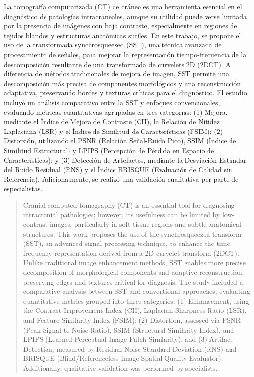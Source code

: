 \begin{resumen}
	La tomografía computarizada (CT) de cráneo es una herramienta esencial en el diagnóstico de patologías intracraneales, aunque su utilidad puede verse limitada por la presencia de imágenes con bajo contraste, especialmente en regiones de tejidos blandos y estructuras anatómicas sutiles. En este trabajo, se propone el uso de la transformada synchrosqueezed (SST), una técnica avanzada de procesamiento de señales, para mejorar la representación tiempo-frecuencia de la descomposición resultante de una transformada de curvelets 2D (2DCT). A diferencia de métodos tradicionales de mejora de imagen, SST permite una descomposición más precisa de componentes morfológicos y una reconstrucción adaptativa, preservando bordes y texturas críticas para el diagnóstico.  El estudio incluyó un análisis comparativo entre la SST y enfoques convencionales, evaluando métricas cuantitativas agrupadas en tres categorías: (1) Mejora, mediante el Índice de Mejora de Contraste (CII), la Relación de Nitidez Laplaciana (LSR) y el Índice de Similitud de Características (FSIM); (2) Distorsión, utilizando el PSNR (Relación Señal-Ruido Pico), SSIM (Índice de Similitud Estructural) y LPIPS (Percepción de Pérdida en Espacio de Características); y (3) Detección de Artefactos, mediante la Desviación Estándar del Ruido Residual (RNS) y el Índice BRISQUE (Evaluación de Calidad sin Referencia). Adicionalmente, se realizó una validación cualitativa por parte de especialistas.
\end{resumen}

\begin{abstract}
	Cranial computed tomography (CT) is an essential tool for diagnosing intracranial pathologies; however, its usefulness can be limited by low-contrast images, particularly in soft tissue regions and subtle anatomical structures. This work proposes the use of the synchrosqueezed transform (SST), an advanced signal processing technique, to enhance the time-frequency representation derived from a 2D curvelet transform (2DCT). Unlike traditional image enhancement methods, SST enables more precise decomposition of morphological components and adaptive reconstruction, preserving edges and textures critical for diagnosis. The study included a comparative analysis between SST and conventional approaches, evaluating quantitative metrics grouped into three categories: (1) Enhancement, using the Contrast Improvement Index (CII), Laplacian Sharpness Ratio (LSR), and Feature Similarity Index (FSIM); (2) Distortion, assessed via PSNR (Peak Signal-to-Noise Ratio), SSIM (Structural Similarity Index), and LPIPS (Learned Perceptual Image Patch Similarity); and (3) Artifact Detection, measured by Residual Noise Standard Deviation (RNS) and BRISQUE (Blind/Referenceless Image Spatial Quality Evaluator). Additionally, qualitative validation was performed by specialists.
\end{abstract}